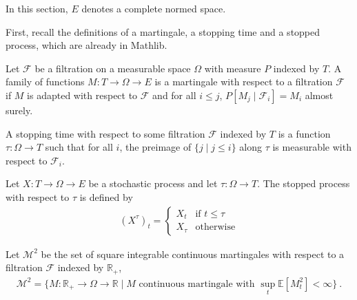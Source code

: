 In this section, $E$ denotes a complete normed space.

First, recall the definitions of a martingale, a stopping time and a stopped process, which are already in Mathlib.


\begin{definition}[Martingale]\label{def:Martingale}
  \mathlibok
Let $\mathcal{F}$ be a filtration on a measurable space $\Omega$ with measure $P$ indexed by $T$.
A family of functions $M : T \to \Omega \to E$ is a martingale with respect to a filtration $\mathcal{F}$ if $M$ is adapted with respect to $\mathcal{F}$ and for all $i \le j$, $P[M_j \mid \mathcal{F}_i] = M_i$ almost surely.
\end{definition}


\begin{definition}\label{def:IsStoppingTime}
  \mathlibok
A stopping time with respect to some filtration $\mathcal{F}$ indexed by $T$ is a function $\tau : \Omega \to T$ such that for all $i$, the preimage of $\{j \mid j \le i\}$ along $\tau$ is measurable with respect to $\mathcal{F}_i$.
\end{definition}


\begin{definition}\label{def:stoppedProcess}
  \mathlibok
Let $X : T \to \Omega \to E$ be a stochastic process and let $\tau : \Omega \to T$.
The stopped process with respect to $\tau$ is defined by
\begin{align*}
  (X^{\tau})_t = \begin{cases}
    X_t & \text{if } t \le \tau \\
    X_{\tau} & \text{otherwise}
  \end{cases}
\end{align*}
\end{definition}


\begin{definition}\label{def:squareIntegrableMartingales}
Let $\mathcal{M}^2$ be the set of square integrable continuous martingales with respect to a filtration $\mathcal{F}$ indexed by $\mathbb{R}_+$,
\begin{align*}
  \mathcal{M}^2
  = \{ M : \mathbb{R}_+ \to \Omega \to \mathbb{R} \mid M \text{ continuous martingale with } \sup_{t}\mathbb{E}[M_t^2] < \infty \}
  \: .
\end{align*}
\end{definition}


